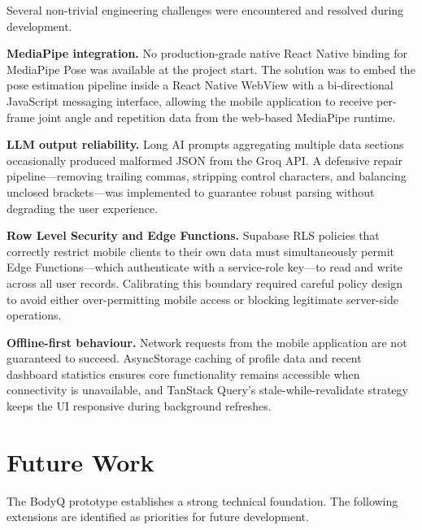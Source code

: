Several non-trivial engineering challenges were encountered and resolved
during development.

\textbf{MediaPipe integration.} No production-grade native React Native
binding for MediaPipe Pose was available at the project start. The solution
was to embed the pose estimation pipeline inside a React Native WebView
with a bi-directional JavaScript messaging interface, allowing the mobile
application to receive per-frame joint angle and repetition data from the
web-based MediaPipe runtime.

\textbf{LLM output reliability.} Long AI prompts aggregating multiple data
sections occasionally produced malformed JSON from the Groq API. A
defensive repair pipeline---removing trailing commas, stripping control
characters, and balancing unclosed brackets---was implemented to guarantee
robust parsing without degrading the user experience.

\textbf{Row Level Security and Edge Functions.} Supabase RLS policies that
correctly restrict mobile clients to their own data must simultaneously
permit Edge Functions---which authenticate with a service-role key---to
read and write across all user records. Calibrating this boundary required
careful policy design to avoid either over-permitting mobile access or
blocking legitimate server-side operations.

\textbf{Offline-first behaviour.} Network requests from the mobile
application are not guaranteed to succeed. AsyncStorage caching of profile
data and recent dashboard statistics ensures core functionality remains
accessible when connectivity is unavailable, and TanStack Query's
stale-while-revalidate strategy keeps the UI responsive during background
refreshes.

\section{Future Work}

The BodyQ prototype establishes a strong technical foundation. The
following extensions are identified as priorities for future development.

